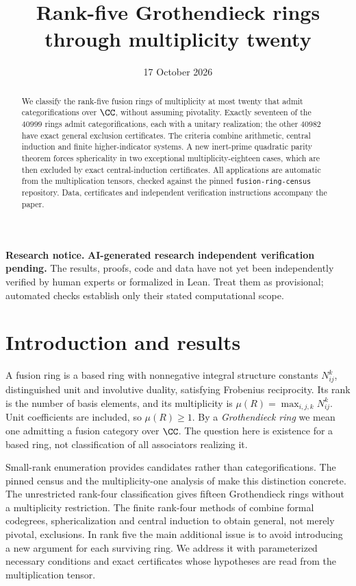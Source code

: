 \documentclass[11pt]{article}
\title{Rank-five Grothendieck rings through multiplicity twenty}
\author{}
\date{17 October 2026}
\begin{document}
\maketitle
\begin{abstract}
We classify the rank-five fusion rings of multiplicity at most twenty
that admit categorifications over $\CC$, without assuming pivotality.
Exactly seventeen of the $40999$ rings admit categorifications, each
with a unitary realization; the other $40982$ have exact general
exclusion certificates. The criteria combine arithmetic, central
induction and finite higher-indicator systems. A new inert-prime
quadratic parity theorem forces sphericality in two exceptional
multiplicity-eighteen cases, which are then excluded by
exact central-induction certificates. All applications are automatic
from the multiplication tensors, checked against the pinned
\texttt{fusion-ring-census} repository. Data, certificates and
independent verification instructions accompany the paper.
\end{abstract}
\par\medskip\noindent\textbf{Research notice.}
\textbf{AI-generated research \textperiodcentered{} independent verification pending.} The results, proofs, code and data have not yet
been independently verified by human experts or formalized in Lean. Treat them
as provisional; automated checks establish only their stated computational scope.
\par\medskip

\setcounter{tocdepth}{1}
\tableofcontents

\section{Introduction and results}
A fusion ring is a based ring with nonnegative integral structure
constants $N_{ij}^k$, distinguished unit and involutive duality, satisfying
Frobenius reciprocity. Its rank is the number of basis elements, and its
multiplicity is $\mu(R)=\max_{i,j,k}N_{ij}^k$. Unit coefficients are included,
so $\mu(R)\ge1$. By a \emph{Grothendieck ring} we mean one admitting a
fusion category over $\CC$. The question here is existence for a based
ring, not classification of all associators realizing it.

Small-rank enumeration provides candidates rather than categorifications.
The pinned census \cite{Census} and the multiplicity-one analysis of \cite{LPR}
make this distinction concrete. The unrestricted rank-four classification
\cite{Rank4General} gives fifteen Grothendieck rings without a multiplicity
restriction. The finite rank-four methods of \cite{DP} combine formal
codegrees, sphericalization and central induction to
obtain general, not merely pivotal, exclusions. In rank five the main
additional issue is to avoid introducing a new argument for each surviving
ring. We address it with parameterized necessary conditions and exact
certificates whose hypotheses are read from the multiplication tensor.
\end{document}
